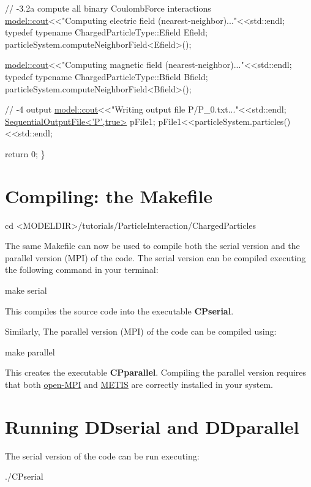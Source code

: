 \begin{DoxyCodeInclude}
    \textcolor{comment}{// -3.2a compute all binary CoulombForce interactions}
    \hyperlink{namespacemodel_a0ce25fef078a7d9d9cb7cfbabcfbc289}{model::cout}<<\textcolor{stringliteral}{"Computing electric field (nearest-neighbor)..."}<<std::endl;
    \textcolor{keyword}{typedef} \textcolor{keyword}{typename} ChargedParticleType::Efield Efield;
    particleSystem.computeNeighborField<Efield>();

    \hyperlink{namespacemodel_a0ce25fef078a7d9d9cb7cfbabcfbc289}{model::cout}<<\textcolor{stringliteral}{"Computing magnetic field (nearest-neighbor)..."}<<std::endl;
    \textcolor{keyword}{typedef} \textcolor{keyword}{typename} ChargedParticleType::Bfield Bfield;
    particleSystem.computeNeighborField<Bfield>();

    
    \textcolor{comment}{// -4 output}
    \hyperlink{namespacemodel_a0ce25fef078a7d9d9cb7cfbabcfbc289}{model::cout}<<\textcolor{stringliteral}{"Writing output file P/P\_0.txt..."}<<std::endl;
    \hyperlink{classmodel_1_1_sequential_output_file}{SequentialOutputFile<'P',true>} pFile1;
    pFile1<<particleSystem.particles()<<std::endl;

    
    \textcolor{keywordflow}{return} 0;
\}


\end{DoxyCodeInclude}
\hypertarget{_p_i_chargedparticles_FRsource_makefile}{}\section{Compiling\+: the Makefile}\label{_p_i_chargedparticles_FRsource_makefile}
\begin{DoxyVerb}cd <MODELDIR>/tutorials/ParticleInteraction/ChargedParticles
\end{DoxyVerb}


The same Makefile can now be used to compile both the serial version and the parallel version (M\+P\+I) of the code. The serial version can be compiled executing the following command in your terminal\+: \begin{DoxyVerb}make serial
\end{DoxyVerb}
 This compiles the source code into the executable {\bfseries C\+Pserial}.

Similarly, The parallel version (M\+P\+I) of the code can be compiled using\+: \begin{DoxyVerb}make parallel 
\end{DoxyVerb}
 This creates the executable {\bfseries C\+Pparallel}. Compiling the parallel version requires that both \hyperlink{openmpi}{open-\/\+M\+P\+I} and \hyperlink{metis}{M\+E\+T\+I\+S} are correctly installed in your system.\hypertarget{_p_i_chargedparticles_FRsource_run}{}\section{Running D\+Dserial and D\+Dparallel}\label{_p_i_chargedparticles_FRsource_run}
The serial version of the code can be run executing\+: \begin{DoxyVerb}./CPserial
\end{DoxyVerb}



